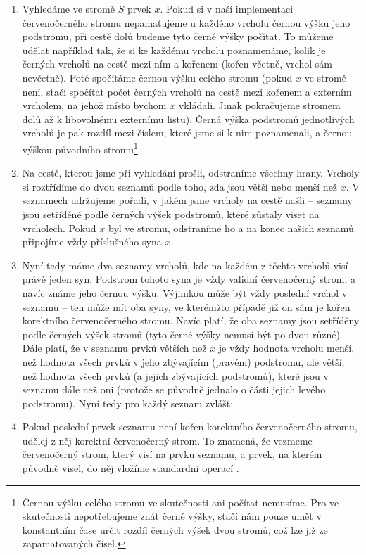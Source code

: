 \begin{enumerate}

\item Vyhledáme ve stromě $S$ prvek $x$. Pokud si v naší implementaci
červenočerného stromu nepamatujeme u každého vrcholu černou výšku jeho
podstromu, při cestě dolů budeme tyto černé výšky počítat. To můžeme udělat
například tak, že si ke každému vrcholu poznamenáme, kolik je černých vrcholů
na cestě mezi ním a kořenem (kořen včetně, vrchol sám nevčetně). Poté spočítáme
černou výšku celého stromu (pokud $x$ ve stromě není, stačí spočítat počet
černých vrcholů na cestě mezi kořenem a externím vrcholem, na jehož místo
bychom $x$ vkládali. Jinak pokračujeme stromem dolů až k libovolnému externímu
listu). Černá výška podstromů jednotlivých vrcholů je pak rozdíl mezi číslem,
které jsme si k nim poznamenali, a černou výškou původního
stromu\footnote{Černou výšku celého stromu ve skutečnosti ani počítat nemusíme.
Pro  ve skutečnosti nepotřebujeme znát černé výšky, stačí nám pouze umět v
konstantním čase určit rozdíl černých výšek dvou stromů, což lze již ze
zapamatovaných čísel.}.

\item Na cestě, kterou jsme při vyhledání prošli, odstraníme všechny hrany.
Vrcholy si roztřídíme do dvou seznamů podle toho, zda jsou větší nebo menší než
$x$. V seznamech udržujeme pořadí, v jakém jsme vrcholy na cestě našli --
seznamy jsou setříděné podle černých výšek podstromů, které zůstaly viset na
vrcholech. Pokud $x$ byl ve stromu, odstraníme ho a na konec našich seznamů
připojíme vždy příslušného syna $x$.

\item Nyní tedy máme dva seznamy vrcholů, kde na každém z těchto vrcholů visí
právě jeden syn. Podstrom tohoto syna je vždy validní červenočerný strom, a
navíc známe jeho černou výšku. Výjimkou může být vždy poslední vrchol v seznamu
-- ten může mít oba syny, ve kterémžto případě již on sám je kořen korektního
červenočerného stromu. Navíc platí, že oba seznamy jsou setříděny podle černých výšek stromů (tyto černé výšky nemusí být po dvou různé). Dále platí, že v seznamu prvků větších než $x$ je vždy hodnota vrcholu menší, než hodnota všech prvků v jeho zbývajícím (pravém) podstromu, ale větší, než hodnota všech prvků (a jejich zbývajících podstromů), které jsou v seznamu dále než oni (protože se původně jednalo o části jejich levého podstromu). Nyní tedy pro každý seznam zvlášť:

\item Pokud poslední prvek seznamu není kořen korektního červenočerného stromu, udělej z něj korektní červenočerný strom. To znamená, že vezmeme červenočerný strom, který visí na prvku seznamu, a prvek, na kterém původně visel, do něj vložíme standardní operací .


\end{enumerate}
